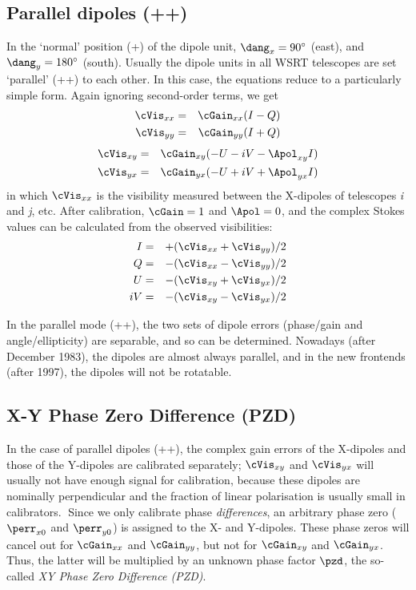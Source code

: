 \subsection{Parallel dipoles (++)}

In the `normal' position (+) of the dipole unit, $\dang_x=90^\circ$ (east), and
$\dang_y=180^\circ$ (south). Usually the dipole units in all WSRT telescopes
are set `parallel' (++) to each other. In this case, the equations reduce to a
particularly simple form. Again ignoring second-order terms, we get %
\begin{eqnarray}
\cVis_{xx} &=& \cGain_{xx}(I-Q) \nonumber\\
\cVis_{yy} &=& \cGain_{yy}(I+Q)
\label{.equ.pol.008}
\end{eqnarray}
%
\begin{eqnarray}
\cVis_{xy} &=& \cGain_{xy}(-U - iV - \Apol_{xy} I) \nonumber\\
\cVis_{yx} &=& \cGain_{yx}(-U + iV + \Apol_{yx} I)
\label{.equ.pol.010}
\end{eqnarray}
%
in which $\cVis_{xx}$ is the visibility measured between the X-dipoles of
telescopes {\em i} and {\em j}, etc. After calibration, $\cGain=1$ and
$\Apol=0$, and the complex Stokes values can be calculated from the observed
visibilities:
%
\begin{eqnarray} I&=& +(\cVis_{xx} + \cVis_{yy})/2  \nonumber \\ Q&=&
-(\cVis_{xx} - \cVis_{yy})/2  \nonumber \\ U&=& -(\cVis_{xy} + \cVis_{yx})/2
\nonumber \\ iV&=& -(\cVis_{xy} -
\cVis_{yx})/2
\label{.equ.pol.014}
\end{eqnarray}

In the parallel mode (++), the two sets of dipole errors (phase/gain and
angle/ellipticity) are separable, and so can be determined. Nowadays (after
December 1983), the dipoles are almost always parallel, and in the new
frontends (after 1997), the dipoles will not be rotatable.


\subsection{X-Y Phase Zero Difference (PZD)}

In the case of parallel dipoles (++), the complex gain errors of the X-dipoles
and those of the Y-dipoles are calibrated separately; $\cVis_{xy}$ and
$\cVis_{yx}$ will usually not have enough signal for calibration, because these
dipoles are nominally perpendicular and the fraction of linear polarisation is
usually small in calibrators. Since we only calibrate phase {\em differences},
an arbitrary phase zero ($\perr_{x0}$ and $\perr_{y0}$) is assigned to the X-
and Y-dipoles. These phase zeros will cancel out for $\cGain_{xx}$ and
$\cGain_{yy}$, but not for $\cGain_{xy}$ and $\cGain_{yx}$. Thus, the latter
will be multiplied by an unknown phase factor $\pzd$, the so-called {\em XY
Phase Zero Difference (PZD)}.

